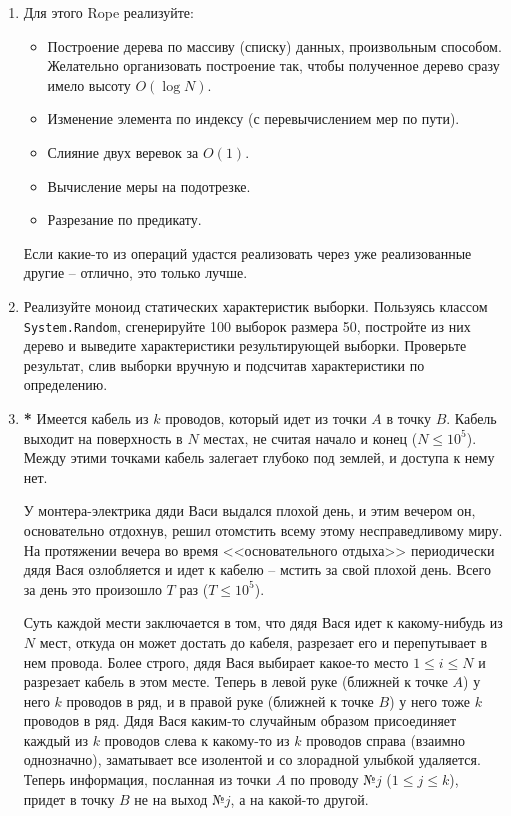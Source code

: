 \documentclass[a4paper,11pt]{article}
\begin{document}
\begin{enumerate}[{3-}1]
\begin{enumerate}
\item Для этого Rope реализуйте:
\begin{itemize}
\item Построение дерева по массиву (списку) данных, произвольным способом.
Желательно организовать построение так, чтобы полученное дерево сразу имело
высоту $O(\log N)$.
\item Изменение элемента по индексу (с перевычислением мер по пути).
\item Слияние двух веревок за $O(1)$.
\item Вычисление меры на подотрезке.
\item Разрезание по предикату.
\end{itemize}
Если какие-то из операций удастся реализовать через уже реализованные другие
-- отлично, это только лучше.
\item Реализуйте моноид статических характеристик выборки. Пользуясь классом
\texttt{System.Random}, сгенерируйте 100 выборок размера 50, постройте из них
дерево и выведите характеристики результирующей выборки. Проверьте результат,
слив выборки вручную и подсчитав характеристики по определению.

\item \textbf{*} Имеется кабель из $k$ проводов, который идет из точки $A$ в
точку $B$. Кабель выходит на поверхность в $N$ местах, не считая начало и конец
($N \le 10^5$). Между этими точками кабель залегает глубоко под землей, и
доступа к нему нет.

У монтера-электрика дяди Васи выдался плохой день, и этим вечером он,
основательно отдохнув, решил отомстить всему этому несправедливому миру. На
протяжении вечера во время <<основательного отдыха>> периодически дядя Вася
озлобляется и идет к кабелю -- мстить за свой плохой день. Всего за день это
произошло $T$ раз ($T \le 10^5$).

Суть каждой мести заключается в том, что дядя Вася идет к какому-нибудь из
$N$ мест, откуда он может достать до кабеля, разрезает его и перепутывает в
нем провода. Более строго, дядя Вася выбирает какое-то место $1\le i\le N$ и
разрезает кабель в этом месте. Теперь в левой руке (ближней к точке $A$) у
него $k$ проводов в ряд, и в правой руке (ближней к точке $B$) у него тоже
$k$ проводов в ряд. Дядя Вася каким-то случайным образом присоединяет каждый
из $k$ проводов слева к какому-то из $k$ проводов справа (взаимно однозначно),
заматывает все изолентой и со злорадной улыбкой удаляется. Теперь информация,
посланная из точки $A$ по проводу №$j$ ($1\le j \le k$), придет в точку $B$
не на выход №$j$, а на какой-то другой.


\end{enumerate}
\end{enumerate}
\end{document}
